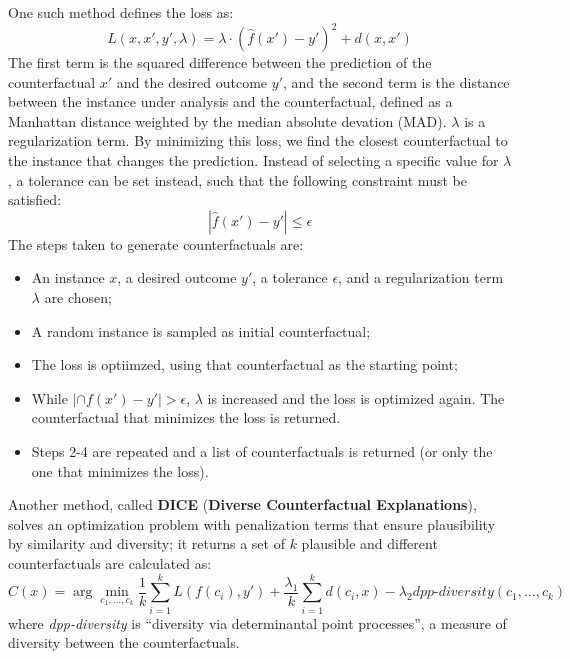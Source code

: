 One such method defines the loss as:
\begin{equation*}
    L(x,x',y',\lambda) = \lambda \cdot (\hat{f}(x') - y')^2 + d(x,x')
\end{equation*}
The first term is the squared difference between the prediction of the counterfactual $x'$ and the desired outcome $y'$, and the second term is the distance between the instance under analysis and the counterfactual, defined as a Manhattan distance weighted by the median absolute devation (MAD). $\lambda$ is a regularization term. By minimizing this loss, we find the closest counterfactual to the instance that changes the prediction. Instead of selecting a specific value for $\lambda$, a tolerance can be set instead, such that the following constraint must be satisfied:
\begin{equation*}
    |\hat{f}(x') - y'| \leq \epsilon
\end{equation*}
The steps taken to generate counterfactuals are:
\begin{itemize}
    \item An instance $x$, a desired outcome $y'$, a tolerance $\epsilon$, and a regularization term $\lambda$ are chosen;
    \item A random instance is sampled as initial counterfactual;
    \item The loss is optiimzed, using that counterfactual as the starting point;
    \item While $|\cap{f}(x') - y'| > \epsilon$, $\lambda$ is increased and the loss is optimized again. The counterfactual that minimizes the loss is returned.
    \item Steps 2-4 are repeated and a list of counterfactuals is returned (or only the one that minimizes the loss).
\end{itemize}

Another method, called \textbf{DICE} (\textbf{Diverse Counterfactual Explanations}), solves an optimization problem with penalization terms that ensure plausibility by similarity and diversity; it returns a set of $k$ plausible and different counterfactuals are calculated as:
\begin{equation*}
    C(x) = \arg \min_{c_1, \dots, c_k} \dfrac{1}{k} \sum_{i=1}^k L(f(c_i), y') + \dfrac{\lambda_1}{k} \sum_{i=1}^k d(c_i, x) - \lambda_2 \textit{dpp-diversity}(c_1, \dots, c_k)
\end{equation*}
where \textit{dpp-diversity} is ``diversity via determinantal point processes'', a measure of diversity between the counterfactuals. 

